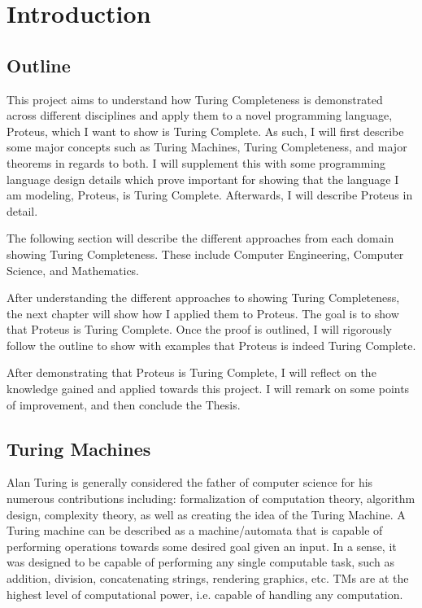 \chapter{Introduction}\label{chapter:Intro}

\section{Outline}

This project aims to understand how Turing Completeness is demonstrated across different disciplines and apply them to a novel programming language, Proteus, which I want to show is Turing Complete.
As such, I will first describe some major concepts such as Turing Machines, Turing Completeness, and major theorems in regards to both.
I will supplement this with some programming language design details which prove important for showing that the language I am modeling, Proteus, is Turing Complete.
Afterwards, I will describe Proteus in detail.

The following section will describe the different approaches from each domain showing Turing Completeness.
These include Computer Engineering, Computer Science, and Mathematics.

After understanding the different approaches to showing Turing Completeness, the next chapter will show how I applied them to Proteus.
The goal is to show that Proteus is Turing Complete.
Once the proof is outlined, I will rigorously follow the outline to show with examples that Proteus is indeed Turing Complete.

After demonstrating that Proteus is Turing Complete, I will reflect on the knowledge gained and applied towards this project.
I will remark on some points of improvement, and then conclude the Thesis.

\section{Turing Machines}\label{sec:TM}

Alan Turing is generally considered the father of computer science for his numerous contributions including: formalization of computation theory, algorithm design, complexity theory, as well as creating the idea of the Turing Machine.
A Turing machine can be described as a machine/automata that is capable of performing operations towards some desired goal given an input.
In a sense, it was designed to be capable of performing any single computable task, such as addition, division, concatenating strings, rendering graphics, etc.
TMs are at the highest level of computational power, i.e. capable of handling any computation.

